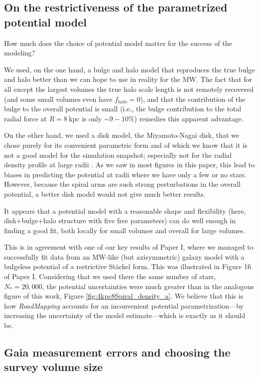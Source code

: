 \documentclass[iop,revtex4,numberedappendix,appendixfloats]{emulateapj}
\newcommand{\RM}{{\sl RoadMapping}}
\begin{document}
\subsection{On the restrictiveness of the parametrized potential model}

How much does the choice of potential model matter for the success of the modeling?

We used, on the one hand, a bulge and halo model that reproduces the true bulge and halo better than we can hope to use in reality for the MW. The fact that for all except the largest volumes the true halo scale length is not remotely recovered (and some small volumes even have $f_\text{halo}=0$), and that the contribution of the bulge to the overall potential is small (i.e., the bulge contribution to the total radial force at $R=8~\text{kpc}$ is only $\sim 9-10\%$) remedies this apparent advantage. 

On the other hand, we used a disk model, the Miyamoto-Nagai disk, that we chose purely for its convenient parametric form and of which we know that it is not a good model for the simulation snapshot; especially not for the radial density profile at large radii \citep{2015MNRAS.448.2934S}. As we saw in most figures in this paper, this lead to biases in predicting the potential at radii where we have only a few or no stars. However, because the spiral arms are such strong perturbations in the overall potential, a better disk model would not give much better results.

It appears that a potential model with a reasonable shape and flexibility (here, disk+bulge+halo structure with five free parameters) can do well enough in finding a good fit, both locally for small volumes and overall for large volumes.

This is in agreement with one of our key results of Paper I, where we managed to successfully fit data from an MW-like (but axisymmetric) galaxy model with a bulgeless potential of a restrictive St\"ackel form. This was illustrated in Figure 16 of Paper I. Considering that we used there the same number of stars, $N_*=20,000$, the potential uncertainties were much greater than in the analogous figure of this work, Figure \ref{fig:4kpc8Spiral_density_a}. We believe that this is how \RM{} accounts for an inconvenient potential parametrization---by increasing the uncertainty of the model estimate---which is exactly as it should be.

\subsection{Gaia measurement errors and choosing the survey volume size} \label{sec:discussion_choosing_SV}
\end{document}
